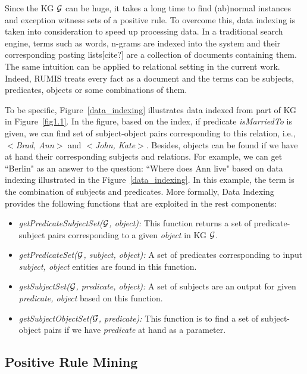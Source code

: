 Since the KG $\mathcal{G}$ can be huge, it takes a long time to find (ab)normal instances and exception witness sets of a positive rule. To overcome this, data indexing is taken into consideration to speed up processing data. In a traditional search engine, terms such as words, n-grams are indexed into the system and their corresponding posting lists[cite?] are a collection of documents containing them. The same intuition can be applied to relational setting in the current work. Indeed, RUMIS treats every fact as a document and the terms can be subjects, predicates, objects or some combinations of them.

To be specific, Figure~\ref{data_indexing} illustrates data indexed from part of KG in Figure~\ref{fig1.1}. In the figure, based on the index, if predicate \textit{isMarriedTo} is given, we can find set of subject-object pairs corresponding to this relation, i.e., \textit{$<$Brad, Ann$>$} and \textit{$<$John, Kate$>$}. Besides, objects can be found if we have at hand their corresponding subjects and relations. For example, we can get ``Berlin" as an answer to the question: ``Where does Ann live" based on data indexing illustrated in the Figure~\ref{data_indexing}. In this example, the term is the combination of subjects and predicates. More formally, Data Indexing provides the following functions that are exploited in the rest components:

\begin{itemize}
\item \textit{getPredicateSubjectSet($\mathcal{G}$, object):} This function returns a set of predicate-subject pairs corresponding to a given \textit{object} in KG $\mathcal{G}$.
\item \textit{getPredicateSet($\mathcal{G}$, subject, object):} A set of predicates corresponding to input \textit{subject, object} entities are found in this function.
\item \textit{getSubjectSet($\mathcal{G}$, predicate, object):} A set of subjects are an output for given \textit{predicate, object} based on this function.
\item \textit{getSubjectObjectSet($\mathcal{G}$, predicate):} This function is to find a set of subject-object pairs if we have \textit{predicate} at hand as a parameter.
\end{itemize}

\subsection{Positive Rule Mining}

